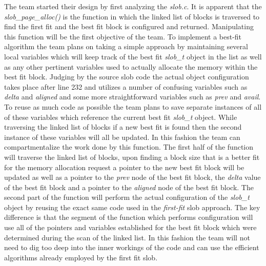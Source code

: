 \documentclass[10pt,onecolumn,draftclsnofoot]{IEEEtran} %
\begin{document}
\begin{singlespace}
	\normalfont \indent The team started their design by first analyzing the \textit{slob.c}. It is apparent that the \textit{slob\_page\_alloc()} is the function in which the linked list of blocks is traversed to find the first fit and the best fit block is configured and returned. Manipulating this function will be the first objective of the team. To implement a best-fit algorithm the team plans on taking a simple approach by maintaining several local variables which will keep track of the best fit \textit{slob\_t} object in the list as well as any other pertinent variables used to actually allocate the memory within the best fit block. Judging by the source slob code the actual object configuration takes place after line 232 and utilizes a number of confusing variables such as \textit{delta} and \textit{aligned} and some more straightforward variables such as \textit{prev} and \textit{avail}. To reuse as much code as possible the team plans to save separate instances of all of these variables which reference the current best fit \textit{slob\_t} object. While traversing the linked list of blocks if a new best fit is found then the second instance of these variables will all be updated. In this fashion the team can compartmentalize the work done by this function. The first half of the function will traverse the linked list of blocks, upon finding a block size that is a better fit for the memory allocation request a pointer to the new best fit block will be updated as well as a pointer to the \textit{prev} node of the best fit block, the \textit{delta} value of the best fit block and a pointer to the \textit{aligned} node of the best fit block. The second part of the function will perform the actual configuration of the \textit{slob\_t} object by reusing the exact same code used in the \textit{first-fit} slob approach. The key difference is that the segment of the function which performs configuration will use all of the  pointers and variables established for the best fit block which were determined during the scan of the linked list. In this fashion the team will not need to dig too deep into the inner workings of the code and can use the efficient algorithms already employed by the first fit slob.   

\end{singlespace}
\end{document}
